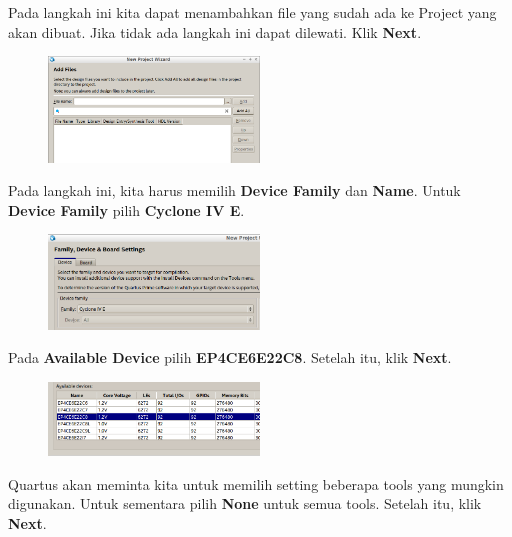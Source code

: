 Pada langkah ini kita dapat menambahkan file yang sudah ada ke Project
yang akan dibuat. Jika tidak ada langkah ini dapat dilewati.
Klik \textbf{Next}.

\begin{figure}[H]
\centering
\includegraphics[width=0.5\textwidth]{images/NewProjectWizard_4.png}
\par
\end{figure}

Pada langkah ini, kita harus memilih \textbf{Device Family} dan
\textbf{Name}. Untuk \textbf{Device Family} pilih \textbf{Cyclone IV E}.

\begin{figure}[H]
\centering
\includegraphics[width=0.5\textwidth]{images/NewProjectWizard_5_device_family.png}
\par
\end{figure}

Pada \textbf{Available Device} pilih \textbf{EP4CE6E22C8}.
Setelah itu, klik \textbf{Next}.

\begin{figure}[H]
\centering
\includegraphics[width=0.5\textwidth]{images/NewProjectWizard_5_device_name.png}
\par
\end{figure}


Quartus akan meminta kita untuk memilih setting beberapa tools yang
mungkin digunakan. Untuk sementara pilih \textbf{None} untuk semua tools.
Setelah itu, klik \textbf{Next}.

